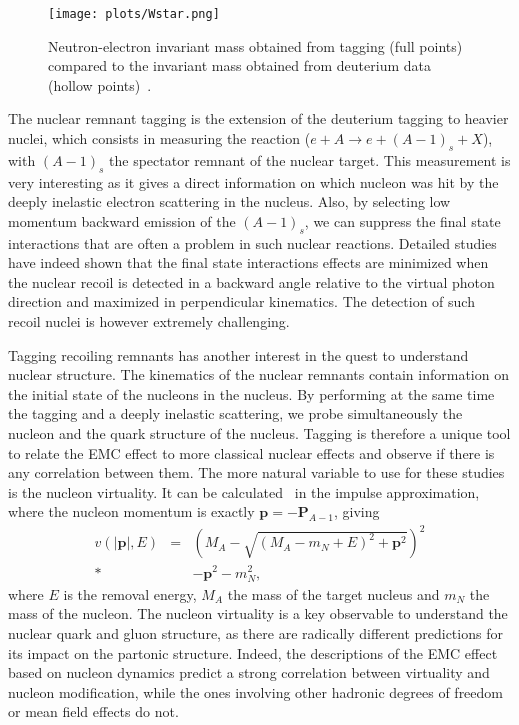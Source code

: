 \begin{figure}[tbp]
\centering\texttt{[image: plots/Wstar.png]}
\caption{Neutron-electron invariant mass obtained from tagging (full points) compared 
to the invariant mass obtained
from deuterium data (hollow points)~\cite{Baillie:2011za}.}
\label{fig:wstar}
\end{figure}

The nuclear remnant tagging is the extension of the deuterium tagging to heavier nuclei, which
consists in measuring the reaction ($e+A \rightarrow e+(A-1)_s+X$), with
$(A-1)_s$ the spectator remnant of the nuclear target. This measurement is very 
interesting as it gives a direct information on which nucleon was hit by the 
deeply inelastic electron scattering in the nucleus. Also, by selecting 
low momentum backward emission of the $(A-1)_s$, we can suppress the 
final state interactions that are often a problem in such nuclear reactions. 
Detailed studies~\cite{CiofidegliAtti:2003pb,Alvioli:2006jd} have indeed shown 
that the final state interactions effects are minimized when the nuclear recoil
is detected in a backward angle relative to 
the virtual photon direction and maximized in perpendicular kinematics.
The detection of such recoil nuclei is however extremely challenging.

Tagging recoiling remnants has another interest in the quest to understand nuclear structure.
The kinematics of the nuclear remnants contain information on the
initial state of the nucleons in the nucleus. By performing at the same time the 
tagging and a deeply inelastic scattering, we probe simultaneously the nucleon and the 
quark structure of the nucleus. Tagging is therefore a unique tool to relate the EMC
effect to more classical nuclear effects and observe if there is any correlation between
them. The more natural variable to use for these studies is the nucleon virtuality.
It can be calculated~\cite{CiofidegliAtti:2007ork} in the impulse 
approximation, where the nucleon momentum is exactly $\mathbf{p} = -\mathbf{P}_{A-1}$, 
giving
\begin{eqnarray}
    v(|\mathbf{p}|, E) &  =  & \left (M_A - \sqrt{(M_A - m_N + E)^2 + \mathbf{p}^2} \right )^2  \\* \nonumber
                    & & -  \mathbf{p}^2 - m_N^2,
\end{eqnarray} 
where $E$ is the removal energy, $M_A$ the mass of the target nucleus
and $m_N$ the mass of the nucleon. The nucleon virtuality is a key 
observable to understand the nuclear quark and gluon structure,
as there are radically different predictions for its impact on the partonic structure.
Indeed, the descriptions of the EMC effect based on nucleon dynamics
predict a strong correlation between virtuality and nucleon modification,
while the ones involving other hadronic degrees of 
freedom or mean field effects do not. 

